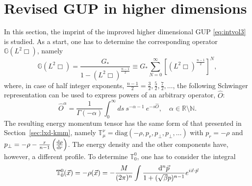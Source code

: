 \section{Revised GUP in higher dimensions}\label{sec:revised-gup}
In this section, the imprint of the improved higher dimensional GUP
\eqref{eq:intvol3} is studied.
%
As a start, one has to determine the corresponding operator $\mathbb{G}\left(L^2\Box\right)$, namely
\begin{equation}
\mathbb{G}\left(L^2\Box\right)=\frac{G_\ast}{1-\left(L^2\Box\right)^{\frac{n-1}{2}}}\equiv G_\ast \sum_{N=0}^\infty \left[\left(L^2\Box\right)^{\frac{n-1}{2}}\right]^N,
\end{equation}
where, in case of half integer exponents, $\frac{n-1}{2}=\frac{3}{2}, \frac{5}{2}, \frac{7}{2}, \dots$, the following Schwinger representation can be used to express  powers of an arbitrary operator, $\hat{O}$:
\begin{equation}
\hat{O}^{\alpha}=\frac{1}{\Gamma(-\alpha)}\int_0^\infty ds \ s^{-\alpha - 1} \ e^{-s\hat{O}}, \quad \alpha\in \mathbb{R}\setminus\mathbb{N}.
\end{equation}
The resulting energy momentum tensor has the same form of that presented in
Section~\ref{sec:lxd-kmm}, namely
$\mathbb{T}_\mu^\nu=\mathrm{diag} \left(-\rho, p_r, p_\perp, p_\perp, \dots\right)$
with $p_r=-\rho$ and $p_\perp=-\rho-\frac{r}{n-1} \left(\frac{\mathrm{d} \rho}{\mathrm{d} r}\right)$.
The energy density and the other components have, however, a different profile.
To determine $\mathbb{T}_0^0$, one has to consider the integral
\begin{align}
\mathbb{T}^0_0(\vec{x}) = -\rho(\vec{x})=-
\frac{M}{(2\pi)^{n}} \int \frac{\mathrm{d}^n\vec{p}}{1 + 
	(\sqrt{\beta} p)^{n-1} }e^{i \vec{x}\cdot\vec{p}}
\label{eq:t00newgup}
\end{align}

